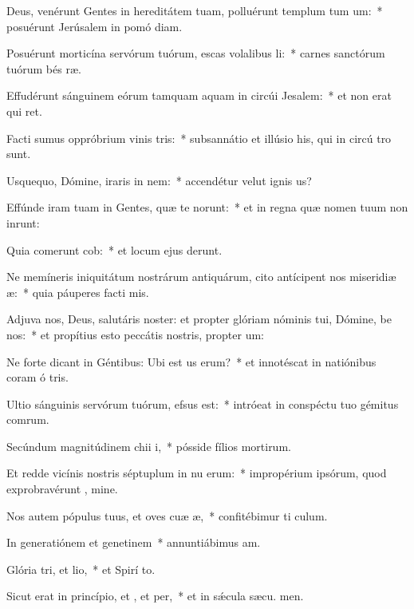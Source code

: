 \item Deus, venérunt Gentes in hereditátem tuam, polluérunt templum tum um:~* posuérunt Jerúsalem in pomó diam.
\item Posuérunt morticína servórum tuórum, escas volalibus li:~* carnes sanctórum tuórum bés ræ.
\item Effudérunt sánguinem eórum tamquam aquam in circúi Jesalem:~* et non erat qui ret.
\item Facti sumus oppróbrium vinis tris:~* subsannátio et illúsio his, qui in circú tro sunt.
\item Usquequo, Dómine, iraris in nem:~* accendétur velut ignis  us?
\item Effúnde iram tuam in Gentes, quæ te  norunt:~* et in regna quæ nomen tuum non inrunt:
\item Quia comerunt cob:~* et locum ejus derunt.
\item Ne memíneris iniquitátum nostrárum antiquárum, cito antícipent nos miseridiæ æ:~* quia páuperes facti  mis.
\item Adjuva nos, Deus, salutáris noster: et propter glóriam nóminis tui, Dómine, be nos:~* et propítius esto peccátis nostris, propter  um:
\item Ne forte dicant in Géntibus: Ubi est us erum?~* et innotéscat in natiónibus coram ó tris.
\item Ultio sánguinis servórum tuórum,  efsus est:~* intróeat in conspéctu tuo gémitus comrum.
\item Secúndum magnitúdinem chii i,~* pósside fílios mortirum.
\item Et redde vicínis nostris séptuplum in nu erum:~* impropérium ipsórum, quod exprobravérunt , mine.
\item Nos autem pópulus tuus, et oves cuæ æ,~* confitébimur ti  culum.
\item In generatiónem et genetinem~* annuntiábimus  am.
\item Glória tri, et lio,~* et Spirí to.
\item Sicut erat in princípio, et , et per,~* et in sǽcula sæcu. men.
